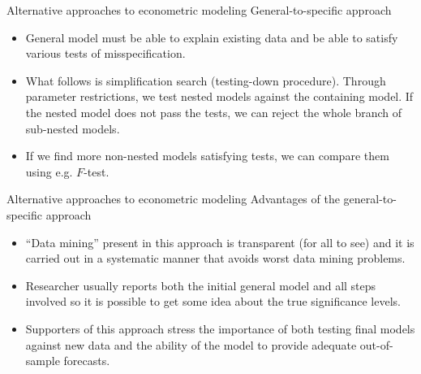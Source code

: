 \documentclass[usenames,dvipsnames]{beamer}
\begin{document}
\begin{frame}{Alternative approaches to econometric modeling}
General-to-specific approach\\
\vspace{0.3cm}
\begin{itemize}
\item General model must be able to explain existing data and be able to satisfy various tests of misspecification.
\vspace{0.3cm}
\item What follows is simplification search (testing-down procedure). Through parameter restrictions, we test nested models against the containing model. If the nested model does not pass the tests, we can reject the whole branch of sub-nested models.
\vspace{0.3cm}
\item If we find more non-nested models satisfying tests, we can compare them using e.g. $F$-test.
\end{itemize}
\end{frame}
\begin{frame}{Alternative approaches to econometric modeling}
Advantages of the general-to-specific approach\\
\vspace{0.3cm}
\begin{itemize}
\item ``Data mining''  present in this approach is transparent (for all to see) and it is carried out in a systematic manner that avoids worst data mining problems. 
\vspace{0.3cm}
\item Researcher usually reports both the initial general model and all steps involved so it is possible to get some idea about the true significance levels.
\vspace{0.3cm}
\item Supporters of this approach stress the importance of both testing final models against new data and the ability of the model to provide adequate out-of-sample forecasts.
\end{itemize}
\end{frame}
\end{document}
